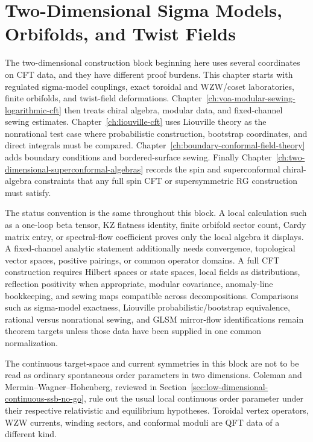 \chapter{Two-Dimensional Sigma Models, Orbifolds, and Twist Fields}
\label{ch:volume-v-sigma-models-orbifolds-twist-fields}
\ConventionsEuclideanCFT

The two-dimensional construction block beginning here uses several coordinates
on CFT data, and they have different proof burdens.  This chapter starts with
regulated sigma-model couplings, exact toroidal and WZW/coset laboratories,
finite orbifolds, and twist-field deformations.
Chapter~\ref{ch:voa-modular-sewing-logarithmic-cft} then treats chiral
algebra, modular data, and fixed-channel sewing estimates.
Chapter~\ref{ch:liouville-cft} uses Liouville theory as the nonrational test
case where probabilistic construction, bootstrap coordinates, and direct
integrals must be compared.  Chapter~\ref{ch:boundary-conformal-field-theory}
adds boundary conditions and bordered-surface sewing.  Finally
Chapter~\ref{ch:two-dimensional-superconformal-algebras} records the spin and
superconformal chiral-algebra constraints that any full spin CFT or
supersymmetric RG construction must satisfy.

The status convention is the same throughout this block.  A local calculation
such as a one-loop beta tensor, KZ flatness identity, finite orbifold sector
count, Cardy matrix entry, or spectral-flow coefficient proves only the local
algebra it displays.  A fixed-channel analytic statement additionally needs
convergence, topological vector spaces, positive pairings, or common operator
domains.  A full CFT construction requires Hilbert spaces or state spaces,
local fields as distributions, reflection positivity when appropriate, modular
covariance, anomaly-line bookkeeping, and sewing maps compatible across
decompositions.  Comparisons such as sigma-model exactness, Liouville
probabilistic/bootstrap equivalence, rational versus nonrational sewing, and
GLSM mirror-flow identifications remain theorem targets unless those data have
been supplied in one common normalization.

The continuous target-space and current symmetries in this block are not to be
read as ordinary spontaneous order parameters in two dimensions.  Coleman and
Mermin--Wagner--Hohenberg, reviewed in
Section~\ref{sec:low-dimensional-continuous-ssb-no-go}, rule out the usual
local continuous order parameter under their respective relativistic and
equilibrium hypotheses.  Toroidal vertex operators, WZW currents, winding
sectors, and conformal moduli are QFT data of a different kind.


